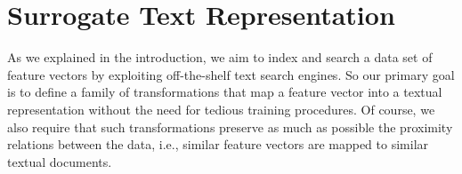 

\section{Surrogate Text Representation}
\label{sec:str:surrogate}
As we explained in the introduction, we aim to index and search a data set of feature vectors by exploiting off-the-shelf text search engines.
So our primary goal is to define a family of transformations that map a feature vector into a textual representation without the need for tedious training procedures.
Of course, we also require that such transformations preserve as much as possible the proximity relations between the data, i.e., similar feature vectors are mapped to similar textual documents.

